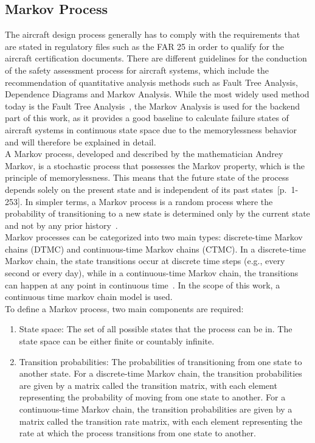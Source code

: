 \subsection{Markov Process}\label{subsec:markov-process}
The aircraft design process generally has to comply with the requirements that are stated in regulatory files such as the FAR 25
in order to qualify for the aircraft certification documents.
There are different guidelines for the conduction of the safety assessment process for aircraft systems, which include the
recommendation of quantitative analysis methods such as Fault Tree Analysis, Dependence Diagrams and Markov Analysis.
While the most widely used method today is the Fault Tree Analysis~\cite{7447967}, the Markov Analysis is used for the backend
part of this work, as it provides a good baseline to calculate failure states of aircraft systems in continuous state space due to the memorylessness behavior
and will therefore be explained in detail.
\\
A Markov process, developed and described by the mathematician Andrey Markov, is a stochastic process that possesses the Markov property,
which is the principle of memorylessness.
This means that the future state of the process depends solely on the present state and is independent of its past states~[p.~1-253]\cite{markov-chanis-theory-to-impl}.
In simpler terms, a Markov process is a random process where the probability of transitioning to a new state is determined
only by the current state and not by any prior history~\cite{markov-processes}.
\\
Markov processes can be categorized into two main types:
discrete-time Markov chains (\gls{DTMC}) and continuous-time Markov chains (\gls{CTMC}).
In a discrete-time Markov chain, the state transitions occur at discrete time steps (e.g., every second or every day),
while in a continuous-time Markov chain, the transitions can happen at any point in continuous time~\cite{markov-processes, VANKAMPEN200773}.
In the scope of this work, a continuous time markov chain model is used.
\\
To define a Markov process, two main components are required:
\begin{enumerate}
    \item State space: The set of all possible states that the process can be in. The state space can be either finite or countably infinite.
    \item Transition probabilities: The probabilities of transitioning from one state to another state. For a discrete-time Markov chain, the transition probabilities are given by a matrix called the transition matrix, with each element representing the probability of moving from one state to another. For a continuous-time Markov chain, the transition probabilities are given by a matrix called the transition rate matrix, with each element representing the rate at which the process transitions from one state to another.
\end{enumerate}
